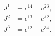 \begin{equation}
\label{JOform2}
\begin{aligned}
   J^1 &= e^{14} + e^{23} , \\
   J^2 &= e^{13} + e^{42} , \\ 
   J^3 &= e^{12} + e^{34} .
\end{aligned} 
\end{equation}

